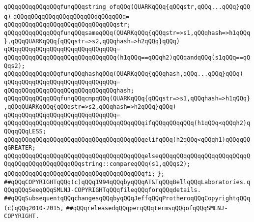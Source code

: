 \verb|qQQqqQQqqQQqqQQqfunqQQqstring_ofqQQq(QUARKqQQq{qQQqstr,qQQq...qQQq}qQQq)|\newline
\verb|qQQqqQQqqQQqqQQqqQQqqQQqqQQqqQQq=|\newline
\verb|qQQqqQQqqQQqqQQqqQQqqQQqqQQqqQQqstr;|\newline
\newline
\verb|qQQqqQQqqQQqqQQqfunqQQqsameqQQq(QUARKqQQq{qQQqstr=>s1,qQQqhash=>h1qQQq},qQQqQUARKqQQq{qQQqstr=>s2,qQQqhash=>h2qQQq}qQQq)|\newline
\verb|qQQqqQQqqQQqqQQqqQQqqQQqqQQqqQQq=|\newline
\verb|qQQqqQQqqQQqqQQqqQQqqQQqqQQqqQQq(h1qQQq==qQQqh2)qQQqandqQQq(s1qQQq==qQQqs2);|\newline
\newline
\verb|qQQqqQQqqQQqqQQqfunqQQqhashqQQq(QUARKqQQq{qQQqhash,qQQq...qQQq}qQQq)|\newline
\verb|qQQqqQQqqQQqqQQqqQQqqQQqqQQqqQQq=|\newline
\verb|qQQqqQQqqQQqqQQqqQQqqQQqqQQqqQQqhash;|\newline
\newline
\verb|qQQqqQQqqQQqqQQqfunqQQqcmpqQQq(QUARKqQQq{qQQqstr=>s1,qQQqhash=>h1qQQq},qQQqQUARKqQQq{qQQqstr=>s2,qQQqhash=>h2qQQq}qQQq)|\newline
\verb|qQQqqQQqqQQqqQQqqQQqqQQqqQQqqQQq=|\newline
\verb|qQQqqQQqqQQqqQQqqQQqqQQqqQQqqQQqqQQqqQQqifqQQqqQQqqQQq(h1qQQq<qQQqh2)qQQqqQQqLESS;|\newline
\verb|qQQqqQQqqQQqqQQqqQQqqQQqqQQqqQQqqQQqqQQqelifqQQq(h2qQQq<qQQqh1)qQQqqQQqGREATER;|\newline
\verb|qQQqqQQqqQQqqQQqqQQqqQQqqQQqqQQqqQQqqQQqelseqQQqqQQqqQQqqQQqqQQqqQQqqQQqqQQqqQQqqQQqqQQqqQQqstring::compareqQQq(s1,qQQqs2);|\newline
\verb|qQQqqQQqqQQqqQQqqQQqqQQqqQQqqQQqqQQqqQQqfi;|\newline
\verb|};|\newline
\newline
\newline
\verb|##qQQqCOPYRIGHTqQQq(c)qQQq1994qQQqbyqQQqAT&TqQQqBellqQQqLaboratories.qQQqqQQqSeeqQQqSMLNJ-COPYRIGHTqQQqfileqQQqforqQQqdetails.|\newline
\verb|##qQQqSubsequentqQQqchangesqQQqbyqQQqJeffqQQqProtheroqQQqCopyrightqQQq(c)qQQq2010-2015,|\newline
\verb|##qQQqreleasedqQQqperqQQqtermsqQQqofqQQqSMLNJ-COPYRIGHT.|\newline

